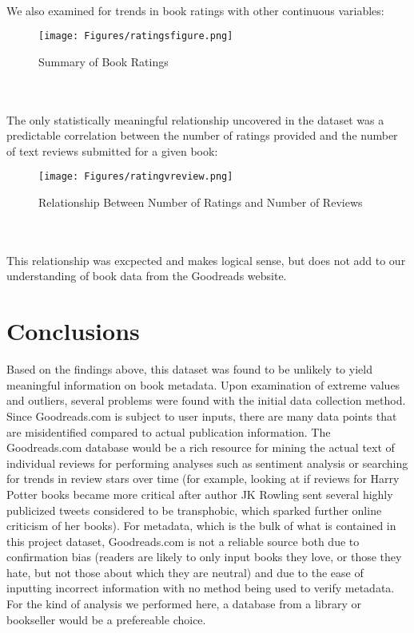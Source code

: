 \documentclass{article}
\begin{document}
\\ We also examined for trends in book ratings with other continuous variables:\\
\begin{figure}[!htbp]
	\centering
	\texttt{[image: Figures/ratingsfigure.png]}
	\caption{Summary of Book Ratings}
\end{figure}\\
\\ The only statistically meaningful relationship uncovered in the dataset was a predictable correlation between the number of ratings provided and the number of text reviews submitted for a given book:\\
\begin{figure}[!htbp]
	\centering
	\texttt{[image: Figures/ratingvreview.png]}
	\caption{Relationship Between Number of Ratings and Number of Reviews}
\end{figure}\\
\\This relationship was excpected and makes logical sense, but does not add to our understanding of book data from the Goodreads website.
\section{Conclusions}
Based on the findings above, this dataset was found to be unlikely to yield meaningful information on book metadata. Upon examination of extreme values and outliers, several problems were found with the initial data collection method. Since Goodreads.com is subject to user inputs, there are many data points that are misidentified compared to actual publication information. The Goodreads.com database would be a rich resource for mining the actual text of individual reviews for performing analyses such as sentiment analysis or searching for trends in review stars over time (for example, looking at if reviews for Harry Potter books became more critical after author JK Rowling sent several highly publicized tweets considered to be transphobic, which sparked further online criticism of her books).
For metadata, which is the bulk of what is contained in this project dataset, Goodreads.com is not a reliable source both due to confirmation bias (readers are likely to only input books they love, or those they hate, but not those about which they are neutral) and due to the ease of inputting incorrect information with no method being used to verify metadata. For the kind of analysis we performed here, a database from a library or bookseller would be a prefereable choice.
\end{document}
